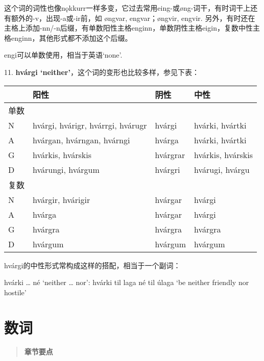 这个词的词性也像nǫkkurr一样多变，它过去常用eing-或øng-词干，有时词干上还有额外的-v，出现-a或-ir前，如
øngvar, engvar；øngvir, engvir.
另外，有时还在主格上添加-nn/-n后缀，有单数阳性主格enginn，单数阴性主格eigin，复数中性主格enginn，其他形式都不添加这个后缀。

engi可以单数使用，相当于英语`none'.

11. \textbf{hvárgi `neither'}，这个词的变形也比较多样，参见下表：

\begin{longtable}{llll}
  \toprule
     & 阳性                                & 阴性       & 中性                \\
  \midrule
  \endhead
  \bottomrule
  \endfoot
  单数 &                                   &          &                   \\
  N  & hvárgi, hvárigr, hvárrgi, hvárugr & hvárgi   & hvárki, hvártki   \\
  A  & hvárgan, hvárngan, hvárngi        & hvárga   & hvárki, hvártki   \\
  G  & hvárkis, hvárskis                 & hvárgrar & hvárkis, hvárskis \\
  D  & hvárungi, hvárgum                 & hvárgri  & hvárugi, hvárgu   \\
  复数 &                                   &          &                   \\
  N  & hvárgir, hvárigir                 & hvárgar  & hvárgi            \\
  A  & hvárga                            & hvárgar  & hvárgi            \\
  G  & hvárgra                           & hvárgra  & hvárgra           \\
  D  & hvárgum                           & hvárgum  & hvárgum           \\
\end{longtable}

hvárgi的中性形式常构成这样的搭配，相当于一个副词：

hvárki \ldots{} né `neither \ldots{} nor': hvárki til laga né til úlaga
`be neither friendly nor hostile'

\chapter{数词}\label{数词}

\begin{quote}
  \textbf{章节要点}
\end{quote}

